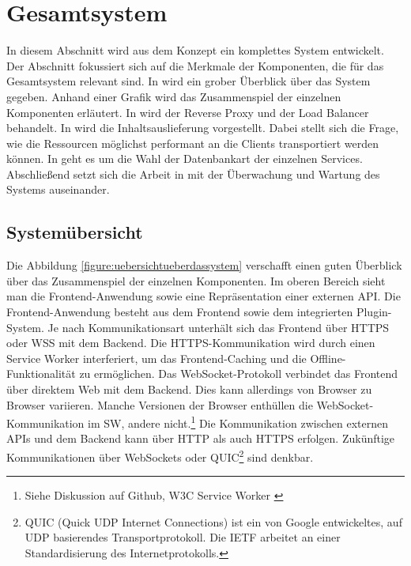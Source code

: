 \section{Gesamtsystem}
\label{sec:gesamtsysten}
In diesem Abschnitt wird aus dem Konzept ein komplettes System
entwickelt. Der Abschnitt fokussiert sich auf die Merkmale der Komponenten,
die für das Gesamtsystem relevant sind. In  wird
ein grober Überblick über das System gegeben. Anhand einer Grafik wird das Zusammenspiel
der einzelnen Komponenten erläutert. In  
wird der Reverse Proxy und der Load Balancer behandelt. In  wird
die Inhaltsauslieferung vorgestellt. Dabei stellt sich die Frage,
wie die Ressourcen möglichst performant an die Clients transportiert
werden können. In  geht es um die Wahl
der Datenbankart der einzelnen Services. Abschließend setzt sich die Arbeit
in  mit der Überwachung und Wartung
des Systems auseinander.

\subsection{Systemübersicht}
\label{subsec:systemuebersicht}
Die Abbildung \ref{figure:uebersichtueberdassystem} verschafft einen guten Überblick
über das Zusammenspiel der einzelnen Komponenten. Im oberen Bereich sieht man die
Frontend\hyp{}Anwendung sowie eine Repräsentation einer externen API. Die Frontend\hyp{}Anwendung
besteht aus dem Frontend sowie dem integrierten Plugin-System. Je nach Kommunikationsart
unterhält sich das Frontend über HTTPS oder WSS mit dem Backend. Die HTTPS-Kommunikation
wird durch einen Service Worker interferiert, um das Frontend-Caching und die
Offline-Funktionalität zu ermöglichen. Das WebSocket-Protokoll verbindet das Frontend
über direktem Web mit dem Backend. Dies kann allerdings von Browser zu Browser variieren.
Manche Versionen der Browser enthüllen die WebSocket-Kommunikation im SW, andere
nicht.\footnote{Siehe Diskussion auf Github, W3C Service Worker \cite{GithubIssueWebSocketExpose}}
Die Kommunikation zwischen externen APIs und dem Backend kann über HTTP als auch
HTTPS erfolgen. Zukünftige Kommunikationen über WebSockets oder QUIC\footnote{QUIC (Quick UDP Internet Connections) ist ein von Google entwickeltes, auf UDP basierendes Transportprotokoll.\cite{IETFQUICWhatsHappening} Die IETF arbeitet an einer Standardisierung des Internetprotokolls.\cite{DatatrakcerIETFQuic}}
sind denkbar.

